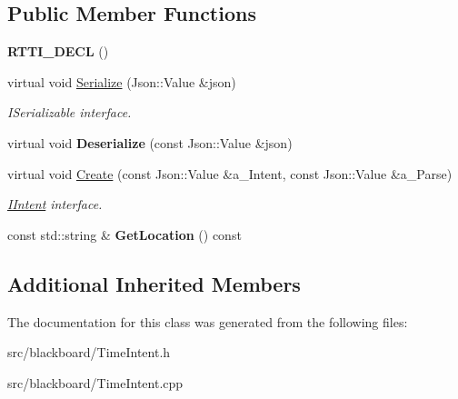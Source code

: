 \subsection*{Public Member Functions}
\begin{DoxyCompactItemize}
\item 
\mbox{\label{class_time_intent_a43b6ec1549a9175446f7a11ec6307082}} 
{\bfseries R\+T\+T\+I\+\_\+\+D\+E\+CL} ()
\item 
\mbox{\label{class_time_intent_a22230611d036ab3ff1b4bfd707b2d99d}} 
virtual void \hyperlink{class_time_intent_a22230611d036ab3ff1b4bfd707b2d99d}{Serialize} (Json\+::\+Value \&json)
\begin{DoxyCompactList}\small\item\em I\+Serializable interface. \end{DoxyCompactList}\item 
\mbox{\label{class_time_intent_aa99689e57b20b2d6f3393e02c72af5a7}} 
virtual void {\bfseries Deserialize} (const Json\+::\+Value \&json)
\item 
\mbox{\label{class_time_intent_a21a9ca7ea4957cf5d5d6c0f715698c04}} 
virtual void \hyperlink{class_time_intent_a21a9ca7ea4957cf5d5d6c0f715698c04}{Create} (const Json\+::\+Value \&a\+\_\+\+Intent, const Json\+::\+Value \&a\+\_\+\+Parse)
\begin{DoxyCompactList}\small\item\em \hyperlink{class_i_intent}{I\+Intent} interface. \end{DoxyCompactList}\item 
\mbox{\label{class_time_intent_ac851e949f3bb52fe3e2846c61451b5e5}} 
const std\+::string \& {\bfseries Get\+Location} () const
\end{DoxyCompactItemize}
\subsection*{Additional Inherited Members}


The documentation for this class was generated from the following files\+:\begin{DoxyCompactItemize}
\item 
src/blackboard/Time\+Intent.\+h\item 
src/blackboard/Time\+Intent.\+cpp\end{DoxyCompactItemize}
